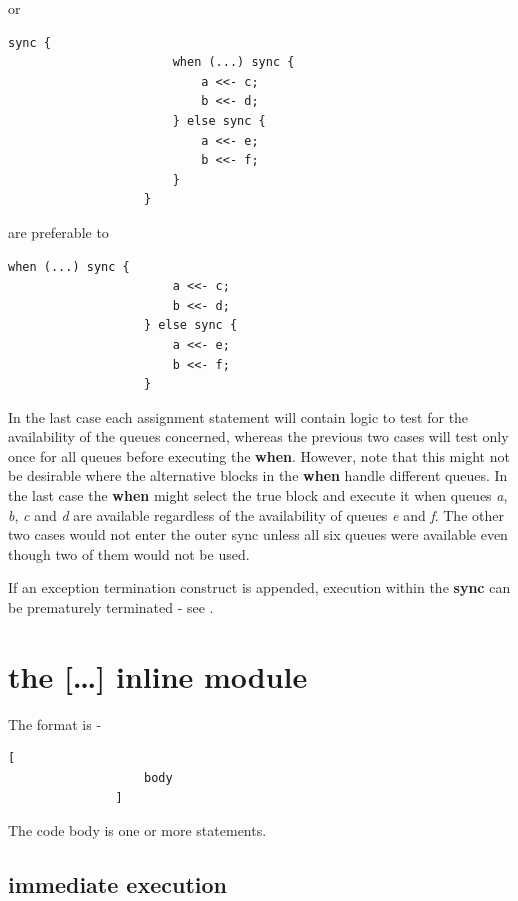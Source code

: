             or
            \begin{lstlisting}[gobble=12, language=threepl]
                   sync {
                       when (...) sync {
                           a <<- c;
                           b <<- d;
                       } else sync {
                           a <<- e;
                           b <<- f;
                       }
                   }
            \end{lstlisting}
            are preferable to
            \begin{lstlisting}[gobble=12, language=threepl]
                   when (...) sync {
                       a <<- c;
                       b <<- d;
                   } else sync {
                       a <<- e;
                       b <<- f;
                   }
            \end{lstlisting}
            In the last case each assignment statement will contain logic to
            test for the availability of the queues concerned, whereas the
            previous two cases will test only once for all queues before
            executing the {\bf when}. However, note that this might not be
            desirable where the alternative blocks in the {\bf when} handle
            different queues. In the last case the {\bf when} might select the
            true block and execute it when queues {\em a}, {\em b}, {\em c} and
            {\em d} are available regardless of the availability of queues {\em
            e} and {\em f}. The other two cases would not enter the outer sync
            unless all six queues were available even though two of them would
            not be used.

            If an exception termination construct is appended, execution within
            the {\bf sync} can be prematurely terminated
            - see .

    \section{the {\bf [\dots]} inline module}

        The format is -
        \begin{lstlisting}[gobble=8, language=threepl]
               [
                   body
               ]
        \end{lstlisting}
        The code body is one or more statements.
        
        \subsection{immediate execution}
        
